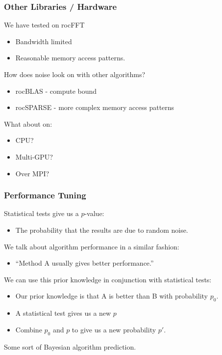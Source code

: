\documentclass[10pt,aspectratio=169]{beamer}
\begin{document}
\begin{frame}
  \frametitle{Other Libraries / Hardware}

  We have tested on rocFFT
  \begin{itemize}
  \item Bandwidth limited
  \item Reasonable memory access patterns.
  \end{itemize}

  \bigskip

  How does noise look on with other algorithms?
  \begin{itemize}
  \item rocBLAS - compute bound
  \item rocSPARSE - more complex memory access patterns
  \end{itemize}
  
  \bigskip
  
  What about on:
  \begin{itemize}
  \item CPU?
  \item Multi-GPU?
  \item Over MPI?
  \end{itemize}
\end{frame}


\begin{frame}
  \frametitle{Performance Tuning}

  Statistical tests give us a $p$-value:
  \begin{itemize}
  \item The probability that the results are due to random noise.
  \end{itemize}

  \bigskip

  We talk about algorithm performance in a similar fashion:
  \begin{itemize}
  \item ``Method A usually gives better performance.''
  \end{itemize}

  \bigskip

  We can use this prior knowledge in conjunction with statistical tests:
  \begin{itemize}
  \item Our prior knowledge is that A is better than B with probability $p_0$.
  \item A statistical test gives us a new $p$
  \item Combine $p_0$ and $p$ to give us a new probability $p'$.
  \end{itemize}

  \bigskip
  Some sort of Bayesian algorithm prediction.
  
\end{frame}
\end{document}
